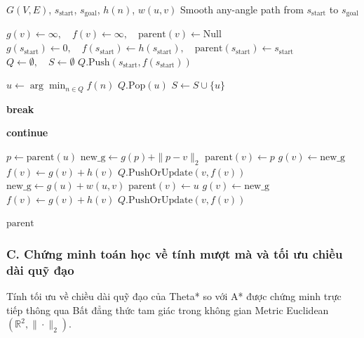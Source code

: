 \documentclass[a4paper, 12pt]{report}
\begin{document}
  \begin{algorithm}[H]
  \caption{Theta* Pathfinding}
  \begin{algorithmic}[1]
  \Require $G(V, E)$, $s_{\text{start}}$, $s_{\text{goal}}$, $h(n)$, $w(u, v)$
  \Ensure Smooth any-angle path from $s_{\text{start}}$ to $s_{\text{goal}}$

      \State $g(v) \gets \infty, \quad f(v) \gets \infty, \quad \text{parent}(v) \gets \text{Null}$
  \EndFor
  \State $g(s_{\text{start}}) \gets 0, \quad f(s_{\text{start}}) \gets h(s_{\text{start}}), \quad \text{parent}(s_{\text{start}}) \gets s_{\text{start}}$
  \State $Q \gets \emptyset, \quad S \gets \emptyset$
  \State $Q.\text{Push}(s_{\text{start}}, f(s_{\text{start}}))$

      \State $u \gets \arg\min_{n \in Q} f(n)$
      \State $Q.\text{Pop}(u)$
      \State $S \gets S \cup \{u\}$
      
          \State \textbf{break}
      \EndIf
      
           \State \textbf{continue} 
          \EndIf
          
          \State $p \gets \text{parent}(u)$
              \State $\text{new\_g} \gets g(p) + \|p - v\|_2$
                  \State $\text{parent}(v) \gets p$
                  \State $g(v) \gets \text{new\_g}$
                  \State $f(v) \gets g(v) + h(v)$
                  \State $Q.\text{PushOrUpdate}(v, f(v))$
              \EndIf
          \Else
              \State $\text{new\_g} \gets g(u) + w(u, v)$
                  \State $\text{parent}(v) \gets u$
                  \State $g(v) \gets \text{new\_g}$
                  \State $f(v) \gets g(v) + h(v)$
                  \State $Q.\text{PushOrUpdate}(v, f(v))$
              \EndIf
          \EndIf
      \EndFor
  \EndWhile

  \State \Return $\text{parent}$
  \end{algorithmic}
  \end{algorithm}

  \subsubsection{C. Chứng minh toán học về tính mượt mà và tối ưu chiều dài quỹ đạo}

  Tính tối ưu về chiều dài quỹ đạo của Theta* so với A* được chứng minh trực tiếp thông qua Bất đẳng thức tam giác trong không gian Metric Euclidean $(\mathbb{R}^2, \|\cdot\|_2)$.
\end{document}
